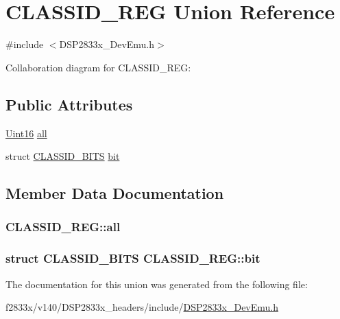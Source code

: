 \hypertarget{union_c_l_a_s_s_i_d___r_e_g}{}\section{C\+L\+A\+S\+S\+I\+D\+\_\+\+R\+E\+G Union Reference}
\label{union_c_l_a_s_s_i_d___r_e_g}


{\ttfamily \#include $<$D\+S\+P2833x\+\_\+\+Dev\+Emu.\+h$>$}



Collaboration diagram for C\+L\+A\+S\+S\+I\+D\+\_\+\+R\+E\+G\+:
\subsection*{Public Attributes}
\begin{DoxyCompactItemize}
\item 
\hyperlink{_d_s_p2833x___device_8h_a59a9f6be4562c327cbfb4f7e8e18f08b}{Uint16} \hyperlink{union_c_l_a_s_s_i_d___r_e_g_aeacdc65d1b605acc308ef342700b6e73}{all}
\item 
struct \hyperlink{struct_c_l_a_s_s_i_d___b_i_t_s}{C\+L\+A\+S\+S\+I\+D\+\_\+\+B\+I\+T\+S} \hyperlink{union_c_l_a_s_s_i_d___r_e_g_a7eec29a68b26d93dc778896c6b9ec770}{bit}
\end{DoxyCompactItemize}


\subsection{Member Data Documentation}
\hypertarget{union_c_l_a_s_s_i_d___r_e_g_aeacdc65d1b605acc308ef342700b6e73}{}
\subsubsection[{all}]{ C\+L\+A\+S\+S\+I\+D\+\_\+\+R\+E\+G\+::all}\label{union_c_l_a_s_s_i_d___r_e_g_aeacdc65d1b605acc308ef342700b6e73}
\hypertarget{union_c_l_a_s_s_i_d___r_e_g_a7eec29a68b26d93dc778896c6b9ec770}{}
\subsubsection[{bit}]{\setlength{\rightskip}{0pt plus 5cm}struct {\bf C\+L\+A\+S\+S\+I\+D\+\_\+\+B\+I\+T\+S} C\+L\+A\+S\+S\+I\+D\+\_\+\+R\+E\+G\+::bit}\label{union_c_l_a_s_s_i_d___r_e_g_a7eec29a68b26d93dc778896c6b9ec770}


The documentation for this union was generated from the following file\+:\begin{DoxyCompactItemize}
\item 
f2833x/v140/\+D\+S\+P2833x\+\_\+headers/include/\hyperlink{_d_s_p2833x___dev_emu_8h}{D\+S\+P2833x\+\_\+\+Dev\+Emu.\+h}\end{DoxyCompactItemize}
